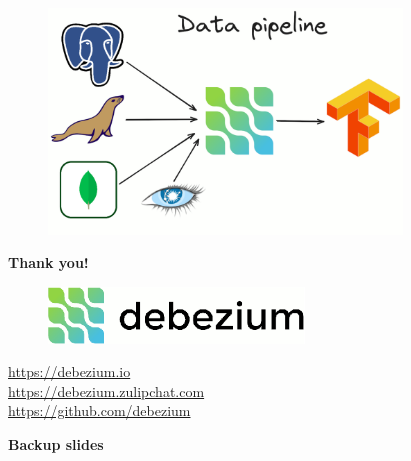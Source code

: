 \documentclass[10pt,utf8]{beamer}
\begin{document}
\begin{frame}
    \begin{figure}
        \centering
        \includegraphics[height=6cm]{./img/dbs_to_tf_debezium.eps}
    \end{figure}
\end{frame}

\begin{frame}
    \centering
    \textbf{\Huge{Thank you!}}
    
    \vspace{1cm}
    
    \begin{figure}
        \centering
        \includegraphics[height=1.5cm]{./img/debezium.eps}
    \end{figure}
    
    \vspace{0.5cm}
    
    \centering
    \color{blue}\url{https://debezium.io}\color{black} \\
    \color{blue}\url{https://debezium.zulipchat.com}\color{black} \\
    \color{blue}\url{https://github.com/debezium}\color{black} \\
\end{frame}


\begin{frame}
	\centering
	\huge{\textbf{Backup slides}}
\end{frame}
\end{document}
